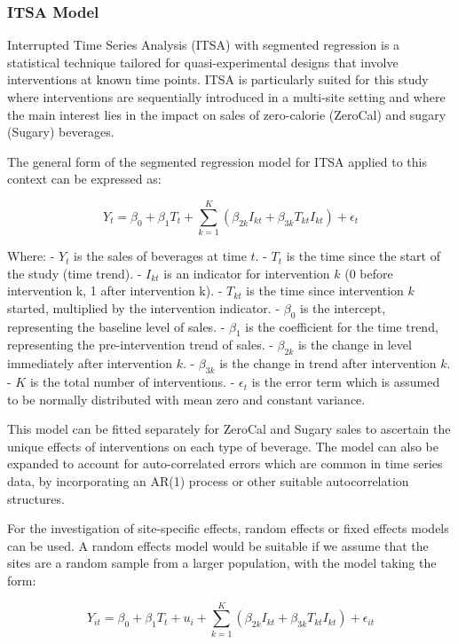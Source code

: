 \documentclass[
]{article}
\begin{document}
\hypertarget{itsa-model}{%
\subsubsection{ITSA Model}\label{itsa-model}}

Interrupted Time Series Analysis (ITSA) with segmented regression is a
statistical technique tailored for quasi-experimental designs that
involve interventions at known time points. ITSA is particularly suited
for this study where interventions are sequentially introduced in a
multi-site setting and where the main interest lies in the impact on
sales of zero-calorie (ZeroCal) and sugary (Sugary) beverages.

The general form of the segmented regression model for ITSA applied to
this context can be expressed as:

\[Y_t = \beta_0 + \beta_1 T_t + \sum_{k=1}^{K} (\beta_{2k} I_{kt} + \beta_{3k} T_{kt} I_{kt}) + \epsilon_t \]

Where: - \(Y_t\) is the sales of beverages at time \(t\). - \(T_t\) is
the time since the start of the study (time trend). - \(I_{kt}\) is an
indicator for intervention \(k\) (0 before intervention k, 1 after
intervention k). - \(T_{kt}\) is the time since intervention \(k\)
started, multiplied by the intervention indicator. - \(\beta_0\) is the
intercept, representing the baseline level of sales. - \(\beta_1\) is
the coefficient for the time trend, representing the pre-intervention
trend of sales. - \(\beta_{2k}\) is the change in level immediately
after intervention \(k\). - \(\beta_{3k}\) is the change in trend after
intervention \(k\). - \(K\) is the total number of interventions. -
\(\epsilon_t\) is the error term which is assumed to be normally
distributed with mean zero and constant variance.

This model can be fitted separately for ZeroCal and Sugary sales to
ascertain the unique effects of interventions on each type of beverage.
The model can also be expanded to account for auto-correlated errors
which are common in time series data, by incorporating an AR(1) process
or other suitable autocorrelation structures.

For the investigation of site-specific effects, random effects or fixed
effects models can be used. A random effects model would be suitable if
we assume that the sites are a random sample from a larger population,
with the model taking the form:

\[Y_{it} = \beta_0 + \beta_1 T_t + u_i + \sum_{k=1}^{K} (\beta_{2k} I_{kt} + \beta_{3k} T_{kt} I_{kt}) + \epsilon_{it} \]
\end{document}
